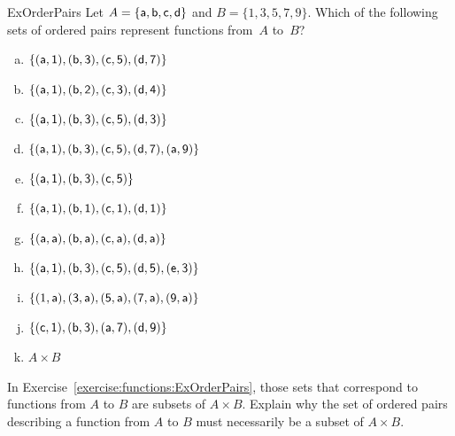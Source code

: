 \begin{exercise}{ExOrderPairs}
Let  $A = \{ \sf{a}, \sf{b}, \sf{c}, \sf{d} \}$ and  $B = \{1,3,5,7,9\}$.
Which of the following sets of ordered pairs represent functions from~$A$ to~$B$?

\begin{multicols}{2}
\begin{enumerate}[a.]
\item \label{WhichAreFuncsEx-a1b3c5d7e9}
$\{ (\sf{a}, 1), (\sf{b}, 3), (\sf{c}, 5), (\sf{d}, 7) \}$
\item \label{WhichAreFuncsEx-a1b2c3d4e5}
$\{ (\sf{a}, 1), (\sf{b}, 2), (\sf{c}, 3), (\sf{d}, 4) \}$
\item \label{WhichAreFuncsEx-a1b3c5d3e1}
$\{ (\sf{a}, 1), (\sf{b}, 3), (\sf{c}, 5), (\sf{d}, 3) \}$
\item \label{WhichAreFuncsEx-a1b3c5d7e9a11}
$\{ (\sf{a}, 1), (\sf{b}, 3), (\sf{c}, 5), (\sf{d}, 7), (\sf{a},9) \}$
\item \label{WhichAreFuncsEx-a1b3c5e7}
$\{ (\sf{a}, 1), (\sf{b}, 3), (\sf{c}, 5) \}$
\item \label{WhichAreFuncsEx-a1b1c1d1e1}
$\{ (\sf{a}, 1), (\sf{b}, 1), (\sf{c}, 1), (\sf{d}, 1) \}$
\item \label{WhichAreFuncsEx-aabacadaea}
$\{ (\sf{a}, \sf{a}), (\sf{b}, \sf{a}), (\sf{c}, \sf{a}), (\sf{d}, \sf{a}) \}$
\item \label{WhichAreFuncsEx-a1b3c5d5e3a1}
$\{ (\sf{a}, 1), (\sf{b}, 3), (\sf{c}, 5), (\sf{d}, 5), (\sf{e}, 3) \}$
\item \label{WhichAreFuncsEx-1a3a5a7a9a11a}
$\{ (1, \sf{a}), (3, \sf{a}), (5, \sf{a}), (7, \sf{a}), (9, \sf{a}) \}$
\item \label{WhichAreFuncsEx-c1b3e5a7d9}
$\{ (\sf{c}, 1), (\sf{b}, 3), (\sf{a}, 7), (\sf{d},9) \}$
\item \label{WhichAreFuncsExACrossB}
$A \times B$
\end{enumerate}
\end{multicols}
\end{exercise}

\begin{exercise}{}
In  Exercise~\ref{exercise:functions:ExOrderPairs}, those sets that correspond to functions from $A$ to $B$ are subsets of $A \times B$.  Explain why the set of ordered pairs describing a function from $A$ to $B$ must necessarily be a subset of $A \times B$.
\end{exercise}


